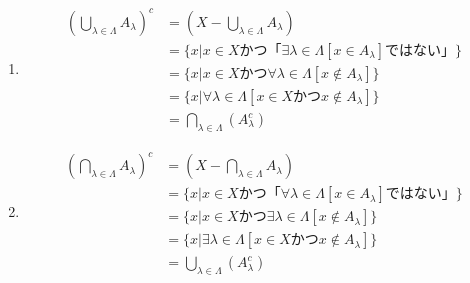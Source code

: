 \documentclass{jsarticle}
\begin{document}
\subsection{}
\begin{enumerate}
\item
\begin{align*}
(\bigcup_{\lambda\in\Lambda}A_{\lambda})^c&=(X-\bigcup_{\lambda\in\Lambda}A_{\lambda})\\
&=\{x|x\in X かつ 「\exists\lambda\in\Lambda [x\in A_\lambda]ではない」\}\\
&=\{x|x\in X かつ \forall \lambda\in\Lambda[x\notin A_\lambda]\}\\
&=\{x|\forall \lambda\in\Lambda[x\in X かつ x\notin A_\lambda]\}\\
&=\bigcap_{\lambda\in\Lambda}(A_\lambda^c)
\end{align*}

\item
\begin{align*}
(\bigcap_{\lambda\in\Lambda}A_{\lambda})^c&=(X-\bigcap_{\lambda\in\Lambda}A_{\lambda})\\
&=\{x|x\in X かつ 「\forall\lambda\in\Lambda [x\in A_\lambda]ではない」\}\\
&=\{x|x\in X かつ \exists \lambda\in\Lambda[x\notin A_\lambda]\}\\
&=\{x|\exists \lambda\in\Lambda[x\in X かつ x\notin A_\lambda]\}\\
&=\bigcup_{\lambda\in\Lambda}(A_\lambda^c)
\end{align*}
\end{enumerate}
\end{document}
